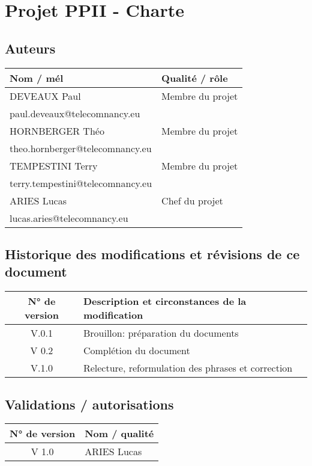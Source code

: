 \documentclass{report}
\begin{document}
\chapter{Projet PPII - Charte}

\section{Auteurs}
\begin{tabular}{l|p{8cm}}
   \textbf{Nom / mél} & \textbf{Qualité / rôle}  \\
   \hline 
    DEVEAUX Paul & Membre du projet  \\
    paul.deveaux@telecomnancy.eu & \\ \hline
    HORNBERGER Théo & Membre du projet \\
    theo.hornberger@telecomnancy.eu & \\ \hline
    TEMPESTINI Terry & Membre du projet \\
    terry.tempestini@telecomnancy.eu & \\ \hline
    ARIES Lucas & Chef du projet \\
    lucas.aries@telecomnancy.eu & \\ \hline
\end{tabular}

\vspace{0.5cm}

\section{Historique des modifications et révisions de ce document}
\begin{tabular}{c|p{10cm}}
   \textbf{N° de version} & \textbf{Description et circonstances de la modification}  \\
   \hline 
    V.0.1 & Brouillon: préparation du documents
    \\\hline
    V 0.2 & Complétion du document
    \\ \hline
    V.1.0 & Relecture, reformulation des phrases et correction
\end{tabular}

\vspace{0.5cm}

\section{Validations / autorisations}
\begin{tabular}{c|p{4cm}}
   \textbf{N° de version} & \textbf{Nom / qualité} 
    \\ \hline  
    V 1.0 & ARIES Lucas 
\end{tabular}
\end{document}
